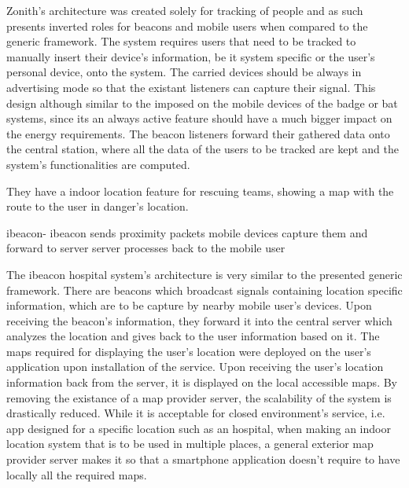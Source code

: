 Zonith's architecture was created solely for tracking of people and as such presents inverted roles for beacons and mobile users when compared to the generic framework. The system requires users that need to be tracked to manually insert their device's information, be it system specific or the user's personal device, onto the system. The carried devices should be always in advertising mode so that the existant listeners can capture their signal. This design although similar to the imposed on the mobile devices of the badge or bat systems, since its an always active feature should have a much bigger impact on the energy requirements. The beacon listeners forward their gathered data onto the central station, where all the data of the users to be tracked are kept and the system's functionalities are computed. 

They have a indoor location feature for rescuing teams, showing a map with the route to the user in danger's location. 


ibeacon- 	ibeacon sends proximity packets
			mobile devices capture them and forward to server
			server processes back to the mobile user

The ibeacon hospital system's architecture is very similar to the presented generic framework. There are beacons which broadcast signals containing location specific information, which are to be capture by nearby mobile user's devices. Upon receiving the beacon's information, they forward it into the central server which analyzes the location and gives back to the user information based on it. The maps required for displaying the user's location were deployed on the user's application upon installation of the service. Upon receiving the user's location information back from the server, it is displayed on the local accessible maps. By removing the existance of a map provider server, the scalability of the system is drastically reduced. While it is acceptable for closed environment's service, i.e. app designed for a specific location such as an hospital, when making an indoor location system that is to be used in multiple places, a general exterior map provider server makes it so that a smartphone application doesn't require to have locally all the required maps.